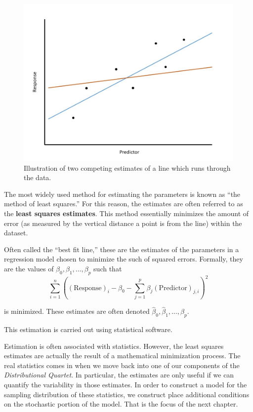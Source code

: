 \documentclass[]{book}
\theoremstyle{definition}
\theoremstyle{definition}
\theoremstyle{definition}
\theoremstyle{remark}
\let\BeginKnitrBlock\begin \let\EndKnitrBlock\end
\begin{document}
\begin{figure}

{\centering \includegraphics[width=0.8\linewidth]{./images/RegModel-LeastSquares} 

}

\caption{Illustration of two competing estimates of a line which runs through the data.}\label{fig:regmodel-least-squares}
\end{figure}

The most widely used method for estimating the parameters is known as
``the method of least squares.'' For this reason, the estimates are
often referred to as the \textbf{least squares estimates}. This method
essentially minimizes the amount of error (as measured by the vertical
distance a point is from the line) within the dataset.

\BeginKnitrBlock{definition}[Least Squares Estimates]
\protect\hypertarget{def:defn-least-squares-estimates}{}{\label{def:defn-least-squares-estimates}
{} }Often called the ``best fit
line,'' these are the estimates of the parameters in a regression model
chosen to minimize the such of squared errors. Formally, they are the
values of \(\beta_0, \beta_1, \dotsc, \beta_p\) such that
\[\sum_{i=1}^n \left((\text{Response})_i - \beta_0 - \sum_{j=1}^p \beta_j(\text{Predictor})_{j,i}\right)^2\]

is minimized. These estimates are often denoted
\(\widehat{\beta}_0, \widehat{\beta}_1, \dotsc, \widehat{\beta}_p\).
\EndKnitrBlock{definition}

This estimation is carried out using statistical software.

Estimation is often associated with statistics. However, the least
squares estimates are actually the result of a mathematical minimization
process. The real statistics comes in when we move back into one of our
components of the \emph{Distributional Quartet}. In particular, the
estimates are only useful if we can quantify the variability in those
estimates. In order to construct a model for the sampling distribution
of these statistics, we construct place additional conditions on the
stochastic portion of the model. That is the focus of the next chapter.
\end{document}
